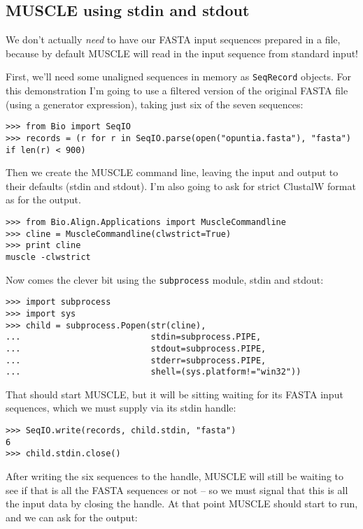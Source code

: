 \documentclass{report}
\begin{document}
\subsection{MUSCLE using stdin and stdout}

We don't actually \emph{need} to have our FASTA input sequences prepared in a file,
because by default MUSCLE will read in the input sequence from standard input!

First, we'll need some unaligned sequences in memory as \verb|SeqRecord| objects.
For this demonstration I'm going to use a filtered version of the original FASTA
file (using a generator expression), taking just six of the seven sequences:

\begin{verbatim}
>>> from Bio import SeqIO
>>> records = (r for r in SeqIO.parse(open("opuntia.fasta"), "fasta") if len(r) < 900)
\end{verbatim}

Then we create the MUSCLE command line, leaving the input and output to their
defaults (stdin and stdout). I'm also going to ask for strict ClustalW format
as for the output.

\begin{verbatim}
>>> from Bio.Align.Applications import MuscleCommandline
>>> cline = MuscleCommandline(clwstrict=True)
>>> print cline
muscle -clwstrict
\end{verbatim}

Now comes the clever bit using the \verb|subprocess| module, stdin and stdout:

\begin{verbatim}
>>> import subprocess
>>> import sys
>>> child = subprocess.Popen(str(cline),
...                          stdin=subprocess.PIPE,
...                          stdout=subprocess.PIPE,
...                          stderr=subprocess.PIPE,
...                          shell=(sys.platform!="win32"))                     
\end{verbatim}

That should start MUSCLE, but it will be sitting waiting for its FASTA input
sequences, which we must supply via its stdin handle:

\begin{verbatim}
>>> SeqIO.write(records, child.stdin, "fasta")
6
>>> child.stdin.close()
\end{verbatim}

After writing the six sequences to the handle, MUSCLE will still be waiting
to see if that is all the FASTA sequences or not -- so we must signal that
this is all the input data by closing the handle. At that point MUSCLE should
start to run, and we can ask for the output:
\end{document}
